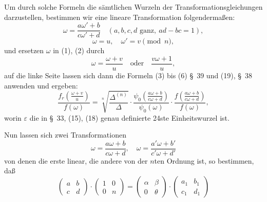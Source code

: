 \documentclass[12pt,a4paper]{article}
\theoremstyle{definition}
\begin{document}
Um durch solche Formeln die sämtlichen Wurzeln der Transformationsgleichungen darzustellen, bestimmen wir eine lineare Transformation folgendermaßen:
\begin{equation}\label{eq:68-3}
\omega = \frac{a\omega' + b}{c\omega' + d} \quad (a,b,c,d \text{ ganz}, \ ad-bc=1),
\end{equation}
\begin{equation}\label{eq:68-4}
\omega = u, \quad \omega' = v \pmod{n},
\end{equation}
und ersetzen $\omega$ in (1), (2) durch
\begin{equation}\label{eq:68-5}
\omega = \frac{\omega + v}{u} \quad \text{oder} \quad \frac{v\omega + 1}{u},
\end{equation}
auf die linke Seite lassen sich dann die Formeln (3) bis (6) \S\ 39 und (19), \S\ 38 anwenden und ergeben:
\begin{equation}\label{eq:68-6}
\frac{f_r(\frac{\omega + v}{u})}{f(\omega)} = \sqrt[n]{\frac{\Delta^{(n)}}{\Delta}} \cdot \frac{\psi_0(\frac{a\omega + b}{c\omega + d})}{\psi_0(\omega)} \cdot \frac{f(\frac{a\omega + b}{c\omega + d})}{f(\omega)},
\end{equation}
worin $\varepsilon$ die in \S\ 33, (15), (18) genau definierte 24ste Einheitswurzel ist.

Nun lassen sich zwei Transformationen
\[
\omega = \frac{a\omega + b}{c\omega + d}, \quad \omega = \frac{a'\omega + b'}{c'\omega + d'}
\]
von denen die erste linear, die andere von der $n$ten Ordnung ist, so bestimmen, daß
\begin{equation}\label{eq:68-7}
\begin{pmatrix} a & b \\ c & d \end{pmatrix} \cdot \begin{pmatrix} 1 & 0 \\ 0 & n \end{pmatrix} = \begin{pmatrix} \alpha & \beta \\ 0 & \theta \end{pmatrix} \cdot \begin{pmatrix} a_1 & b_1 \\ c_1 & d_1 \end{pmatrix}
\end{equation}
\end{document}

